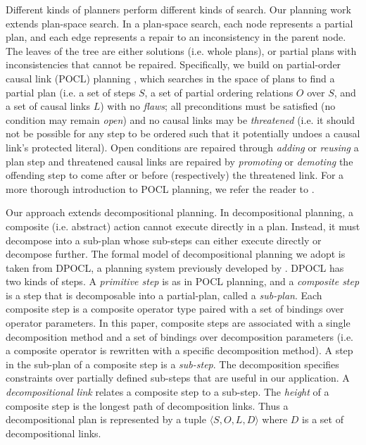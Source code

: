 \documentclass[letterpaper]{article}
\begin{document}
Different kinds of planners perform different kinds of search. Our planning work extends plan-space search. In a plan-space search, each node represents a partial plan, and each edge represents a repair to an inconsistency in the parent node. The leaves of the tree are either solutions (i.e. whole plans), or partial plans with inconsistencies that cannot be repaired. Specifically, we build on partial-order causal link (POCL) planning \cite{penberthy1992ucpop,weld1994introduction}, which searches in the space of plans to find a partial plan (i.e. a set of steps $S$, a set of partial ordering relations $O$ over $S$, and a set of causal links $L$) with no \emph{flaws}; all preconditions must be satisfied (no condition may remain \emph{open}) and no causal links may be \emph{threatened} (i.e. it should not be possible for any step to be ordered such that it potentially undoes a causal link's protected literal). Open conditions are repaired through \emph{adding} or \emph{reusing} a plan step and threatened causal links are repaired by \emph{promoting} or \emph{demoting} the offending step to come after or before (respectively) the threatened link. For a more thorough introduction to POCL planning, we refer the reader to . 

Our approach extends decompositional planning. In decompositional planning, a composite (i.e. abstract) action cannot execute directly in a plan. Instead, it must decompose into a sub-plan whose sub-steps can either execute directly or decompose further. The formal model of decompositional planning we adopt is taken from DPOCL, a planning system previously developed by \cite{young1994decomposition}. DPOCL has two kinds of steps. A \emph{primitive step} is as in POCL planning, and a \textit{composite step} is a step that is decomposable into a partial-plan, called a \textit{sub-plan}. Each composite step is a composite operator type paired with a set of bindings over operator parameters. In this paper, composite steps are associated with a single decomposition method and a set of bindings over decomposition parameters (i.e. a composite operator is rewritten with a specific decomposition method). A step in the sub-plan of a composite step is a \textit{sub-step}. The decomposition specifies constraints over partially defined sub-steps that are useful in our application. A \textit{decompositional link} relates a composite step to a sub-step. The \textit{height} of a composite step is the longest path of decomposition links. Thus a decompositional plan is represented by a tuple $\langle S, O, L, D \rangle$ where $D$ is a set of decompositional links. 
\end{document}
